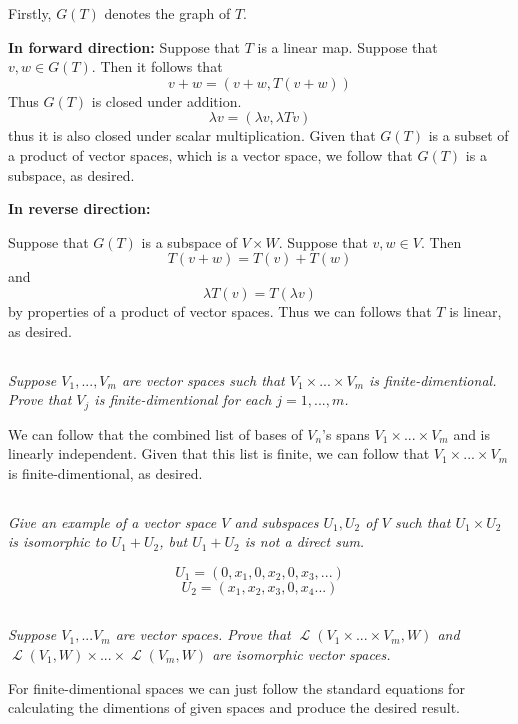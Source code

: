 \documentclass[11pt,oneside,titlepage]{book}
\DeclareMathOperator \map {\mathcal {L}}
\begin{document}
Firstly, $G(T)$ denotes the graph of $T$. 

\textbf{In forward direction: }
Suppose that $T$ is a linear map. Suppose that $v, w \in G(T)$. Then it follows that
$$v + w = (v + w, T(v + w))$$
Thus $G(T)$ is closed under addition.
$$\lambda v = (\lambda v, \lambda Tv)$$
thus it is also closed under scalar multiplication. Given that $G(T)$ is a subset of
a product of vector spaces, which is a vector space, we follow that $G(T)$ is a subspace,
as desired.

\textbf{In reverse direction: }

Suppose that $G(T)$ is a subspace of $V \times W$. Suppose that $v, w \in V$. Then
$$T(v + w) = T(v) + T(w)$$
and
$$\lambda T(v) = T(\lambda v)$$
by properties of a product of vector spaces. Thus we can follows that $T$ is linear, as desired.

\subsection{}

\textit{Suppose $V_1, ..., V_m$ are vector spaces such that $V_1 \times ... \times V_m$ is
  finite-dimentional. Prove that $V_j$ is finite-dimentional for each $j = 1, ..., m$.}

We can follow that the combined list of bases of $V_n$'s spans $V_1 \times ... \times V_m$
and is linearly independent. Given that this list is finite, we
can follow that  $V_1 \times ... \times V_m$ is finite-dimentional, as desired.


\subsection{}

\textit{Give an example of a vector space $V$ and subspaces $U_1, U_2$ of $V$ such that
  $U_1 \times U_2$ is isomorphic to $U_1 + U_2$, but $U_1 + U_2$ is not a direct sum.}

$$U_1 = (0, x_1, 0, x_2, 0, x_3, ...)$$
$$U_2 = (x_1, x_2, x_3, 0, x_4 ...)$$

\subsection{}

\textit{Suppose $V_1, ... V_m$ are vector spaces. Prove that $\map(V_1 \times ... \times V_m, W)$
  and $\map(V_1, W) \times ... \times \map(V_m, W)$ are isomorphic vector spaces.}

For finite-dimentional spaces we can just follow the standard equations for calculating the
dimentions of given spaces and produce the desired result.
\end{document}
